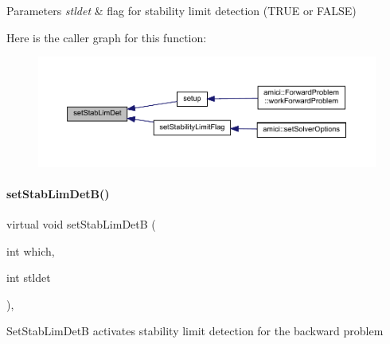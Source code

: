 \begin{DoxyParams}{Parameters}
{\em stldet} & flag for stability limit detection (T\+R\+UE or F\+A\+L\+SE) \\
\hline
\end{DoxyParams}
Here is the caller graph for this function\+:
\nopagebreak
\begin{figure}[H]
\begin{center}
\leavevmode
\includegraphics[width=350pt]{classamici_1_1_solver_a040fb365c47a8e8ccc1f32021b38bfcb_icgraph}
\end{center}
\end{figure}
\mbox{\label{classamici_1_1_solver_acb7f8ad7671faf5fa7e5fa7851e662ec}} 
\paragraph{\texorpdfstring{set\+Stab\+Lim\+Det\+B()}{setStabLimDetB()}}
{\footnotesize\ttfamily virtual void set\+Stab\+Lim\+DetB (\begin{DoxyParamCaption}\item[{int}]{which,  }\item[{int}]{stldet }\end{DoxyParamCaption})\hspace{0.3cm}{\ttfamily [protected]}, {}}

Set\+Stab\+Lim\+DetB activates stability limit detection for the backward problem


